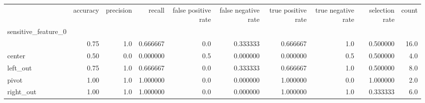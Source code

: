 \begin{tabular}{lrrrrrrrrr}
\toprule
{} &  accuracy &  precision &    recall &  false positive rate &  false negative rate &  true positive rate &  true negative rate &  selection rate &  count \\
sensitive\_feature\_0 &           &            &           &                      &                      &                     &                     &                 &        \\
\midrule
                    &      0.75 &        1.0 &  0.666667 &                  0.0 &             0.333333 &            0.666667 &                 1.0 &        0.500000 &   16.0 \\
center              &      0.50 &        0.0 &  0.000000 &                  0.5 &             0.000000 &            0.000000 &                 0.5 &        0.500000 &    4.0 \\
left\_out            &      0.75 &        1.0 &  0.666667 &                  0.0 &             0.333333 &            0.666667 &                 1.0 &        0.500000 &    8.0 \\
pivot               &      1.00 &        1.0 &  1.000000 &                  0.0 &             0.000000 &            1.000000 &                 0.0 &        1.000000 &    2.0 \\
right\_out           &      1.00 &        1.0 &  1.000000 &                  0.0 &             0.000000 &            1.000000 &                 1.0 &        0.333333 &    6.0 \\
\bottomrule
\end{tabular}
